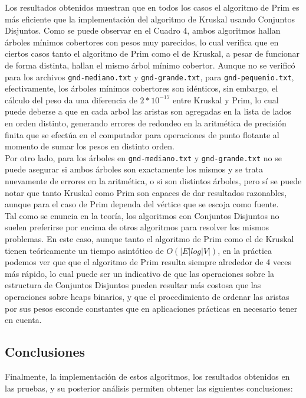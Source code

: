 \documentclass[11pt]{article}
\begin{document}
Los resultados obtenidos muestran que en todos los casos el algoritmo de Prim es 
más eficiente que la implementación del algoritmo de Kruskal usando Conjuntos Disjuntos.
Como se puede observar en el Cuadro 4, ambos algoritmos hallan árboles mínimos cobertores
con pesos muy parecidos, lo cual verifica que en ciertos casos tanto el algoritmo de Prim
como el de Kruskal, a pesar de funcionar de forma distinta, hallan el mismo árbol mínimo
cobertor. Aunque no se verificó para los archivos \texttt{gnd-mediano.txt} y \texttt{gnd-grande.txt},
para \texttt{gnd-pequenio.txt}, efectivamente, los árboles mínimos cobertores son idénticos,
sin embargo, el cálculo del peso da una diferencia de $2*10^{-17}$ entre Kruskal y Prim, lo
cual puede deberse a que en cada arbol las aristas son agregadas en la lista de lados
en orden distinto, generando errores de redondeo en la aritmética de precisión finita que se efectúa
en el computador para operaciones de punto flotante al momento de sumar los pesos en distinto orden. \\

Por otro lado, para los árboles en \texttt{gnd-mediano.txt} y \texttt{gnd-grande.txt} no se 
puede asegurar si ambos árboles son exactamente los mismos y se trata nuevamente de errores
en la aritmética, o si son distintos árboles, pero sí se puede notar que tanto Kruskal como Prim
son capaces de dar resultados razonables, aunque para el caso de Prim dependa del vértice
que se escoja como fuente. \\

Tal como se enuncia en la teoría, los algoritmos con Conjuntos Disjuntos no suelen preferirse
por encima de otros algoritmos para resolver los mismos problemas. En este caso, aunque
tanto el algoritmo de Prim como el de Kruskal tienen teóricamente un tiempo
asintótico de $O(|E|log|V|)$, en la práctica podemos ver que que el algoritmo de Prim resulta
siempre alrededor de 4 veces más rápido, lo cual puede ser un indicativo de que las operaciones
sobre la estructura de Conjuntos Disjuntos pueden resultar más costosa que las operaciones
sobre heaps binarios, y que el procedimiento de ordenar las aristas por sus pesos
esconde constantes que en aplicaciones prácticas en necesario tener en cuenta.

\subsection{Conclusiones}

Finalmente, la implementación de estos algoritmos, los resultados obtenidos en las pruebas, y su
posterior análisis permiten obtener las siguientes conclusiones:
\end{document}

